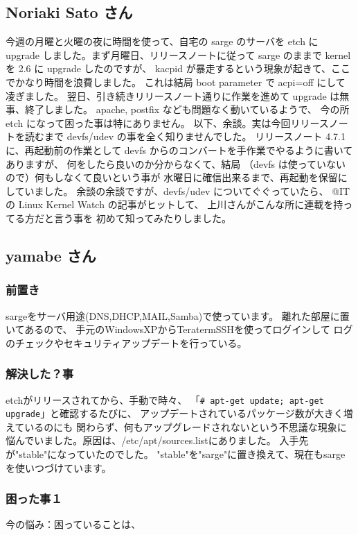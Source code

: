 \documentclass[mingoth,a4paper]{jsarticle}
\begin{document}
\subsection{Noriaki Sato さん}


今週の月曜と火曜の夜に時間を使って、自宅の sarge のサーバを
etch に upgrade しました。まず月曜日、リリースノートに従って
sarge のままで kernel を 2.6 に upgrade したのですが、
kacpid が暴走するという現象が起きて、ここでかなり時間を浪費しました。
これは結局 boot parameter で acpi=off にして凌ぎました。
翌日、引き続きリリースノート通りに作業を進めて
upgrade は無事、終了しました。
apache, postfix なども問題なく動いているようで、
今の所 etch になって困った事は特にありません。
以下、余談。実は今回リリースノートを読むまで
devfs/udev の事を全く知りませんでした。
リリースノート 4.7.1 に、再起動前の作業として
devfs からのコンバートを手作業でやるように書いてありますが、
何をしたら良いのか分からなくて、結局
（devfs は使っていないので）何もしなくて良いという事が
水曜日に確信出来るまで、再起動を保留にしていました。
余談の余談ですが、devfs/udev についてぐぐっていたら、
@IT の Linux Kernel Watch の記事がヒットして、
上川さんがこんな所に連載を持ってる方だと言う事を
初めて知ってみたりしました。

\subsection{yamabe さん}

\subsubsection{前置き}
sargeをサーバ用途(DNS,DHCP,MAIL,Samba)で使っています。
離れた部屋に置いてあるので、
手元のWindowsXPからTeratermSSHを使ってログインして
ログのチェックやセキュリティアップデートを行っている。

\subsubsection{解決した？事}
etchがリリースされてから、手動で時々、
「\verb!# apt-get update; apt-get upgrade!」と確認するたびに、
アップデートされているパッケージ数が大きく増えているのにも
関わらず、何もアップグレードされないという不思議な現象に
悩んでいました。原因は、/etc/apt/sources.listにありました。
入手先が"stable"になっていたのでした。
"stable"を"sarge"に置き換えて、現在もsargeを使いつづけています。

\subsubsection{困った事１}
今の悩み：困っていることは、
\end{document}
